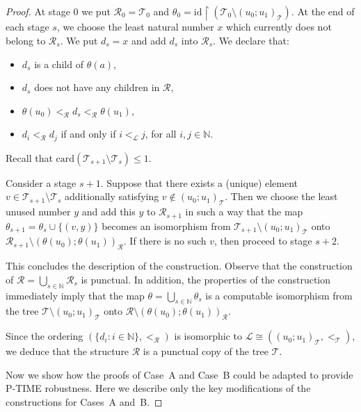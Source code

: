 \documentclass[a4paper,UKenglish,cleveref, autoref, thm-restate]{lipics-v2021}
\begin{document}
\begin{proof}
At stage $0$ we put $\mathcal{R}_0 = \mathcal{T}_0$ and $\theta_0 = \mathrm{id}\upharpoonright (\mathcal{T}_0\setminus (u_0; u_1)_{\mathcal{T}})$. 
At the end of each stage $s$, we choose the least natural number $x$ which currently does not belong to $\mathcal{R}_s$. We put $d_s = x$ and add $d_s$ into $\mathcal{R}_s$. We declare that:
\begin{itemize}
    \item $d_s$ is a child of $\theta(a)$,

    \item $d_s$ does not have any children in $\mathcal{R}$,

    \item $\theta(u_0) <_{\mathcal{R}} d_s <_{\mathcal{R}} \theta(u_1)$,

    \item $d_i <_{\mathcal{R}} d_j$ if and only if $i <_{\mathcal{L}} j$, for all $i,j\in\mathbb{N}$.
\end{itemize}
Recall that $\mathrm{card}(\mathcal{T}_{s+1} \setminus \mathcal{T}_s) \leq 1$.

Consider a stage $s+1$. Suppose that there exists a (unique) element $v \in \mathcal{T}_{s+1} \setminus \mathcal{T}_s$ additionally satisfying $v\not \in (u_0;u_1)_{\mathcal{T}}$. Then we choose the least unused number $y$ and add this $y$ to $\mathcal{R}_{s+1}$ in such a way that the map $\theta_{s+1} = \theta_s \cup \{ (v,y)\}$ becomes an isomorphism from $\mathcal{T}_{s+1} \setminus (u_0;u_1)_{\mathcal{T}}$ onto $\mathcal{R}_{s+1} \setminus (\theta(u_0);\theta(u_1))_{\mathcal{R}}$. If there is no such $v$, then proceed to stage $s+2$.

This concludes the description of the construction. Observe that the construction of $\mathcal{R} = \bigcup_{s\in\mathbb{N}} \mathcal{R}_s$ is punctual. In addition, the properties of the construction immediately imply that the map $\theta = \bigcup_{s\in\mathbb{N}} \theta_s$ is a computable isomorphism from the tree $\mathcal{T} \setminus (u_0;u_1)_{\mathcal{T}}$ onto $\mathcal{R}\setminus (\theta(u_0);\theta(u_1))_{\mathcal{R}}$.

Since the ordering $(\{ d_i : i\in\mathbb{N}\}, <_{\mathcal{R}})$ is isomorphic to $\mathcal{L} \cong ((u_0;u_1)_{\mathcal{T}}, <_{\mathcal{T}})$, we deduce that the structure $\mathcal{R}$ is a punctual copy of the tree $\mathcal{T}$.

    Now we show how the proofs of Case~A and Case~B could be adapted to provide P-TIME robustness. 
    Here we describe only the key modifications of the constructions for Cases~A and~B. 
    

\end{proof}
\end{document}
